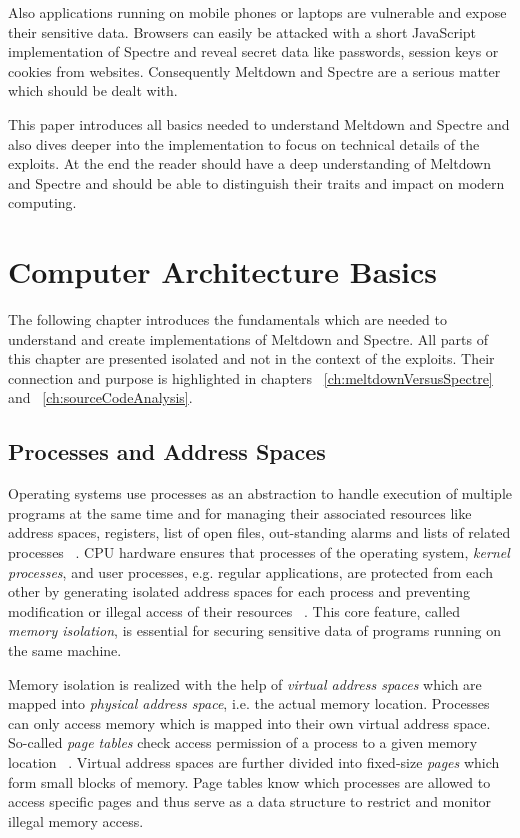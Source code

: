 \documentclass[a4paper,oneside,openright] {scrreprt}
\begin{document}
Also applications running on mobile phones or laptops are vulnerable and expose their sensitive data. 
Browsers can easily be attacked with a short JavaScript implementation of Spectre and reveal secret data
like passwords, session keys or cookies from websites. 
Consequently Meltdown and Spectre are a serious matter which should be dealt with.

This paper introduces all basics needed to understand Meltdown and Spectre and also dives deeper into the implementation
to focus on technical details of the exploits. At the end the reader should have a deep understanding of Meltdown and Spectre
and should be able to distinguish their traits and impact on modern computing.

\chapter{Computer Architecture Basics}
\label{ch:basics}

The following chapter introduces the fundamentals which are needed to understand and create implementations of Meltdown and Spectre. 
All parts of this chapter are presented isolated and not in the context of the exploits. 
Their connection and purpose is highlighted in chapters ~\ref{ch:meltdownVersusSpectre} and ~\ref{ch:sourceCodeAnalysis}.

\section{Processes and Address Spaces}
\label{ch:intro:motivation}

Operating systems use processes as an abstraction to handle execution of multiple programs at the same time
 and for managing their associated resources like address spaces, registers, list of open files, 
 out-standing alarms and lists of related processes ~\cite{tanenbaum2009modern:39-41}. 
CPU hardware ensures that processes of the operating system, \textit{kernel processes}, 
and user processes, e.g. regular applications, are protected from each other by generating isolated address spaces for each process 
and preventing modification or illegal access of their resources ~\cite{silberschatz2012operating}.
This core feature, called \textit{memory isolation}, is essential for securing sensitive data of programs running on the same machine.

Memory isolation is realized with the help of \textit{virtual address spaces} 
which are mapped into \textit{physical address space}, i.e. the actual memory location.
Processes can only access memory which is mapped into their own virtual address space.
So-called \textit{page tables} check access permission of a process to a given memory location ~\cite{hennessy2011computer:105-107}.
Virtual address spaces are further divided into fixed-size \textit{pages} which form small blocks of memory.
Page tables know which processes are allowed to access specific pages and thus serve as
a data structure to restrict and monitor illegal memory access.
\end{document}
